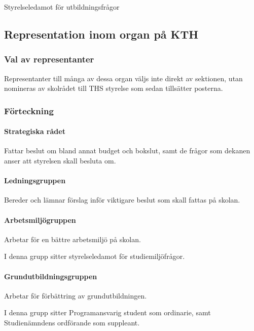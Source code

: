 \documentclass{dgovdoc}
\begin{document}
Styrelseledamot för utbildningsfrågor

\subsection{Representation inom organ på KTH}

\subsubsection{Val av representanter}

Representanter till många av dessa organ väljs inte direkt av sektionen, utan
nomineras av skolrådet till THS styrelse som sedan tillsätter posterna.

\subsubsection{Förteckning}

\paragraph{Strategiska rådet}

Fattar beslut om bland annat budget och bokslut, samt de frågor som dekanen
anser att styrelsen skall besluta om.

\paragraph{Ledningsgruppen}

Bereder och lämnar förslag inför viktigare beslut som skall fattas på skolan.

\paragraph{Arbetsmiljögruppen}

Arbetar för en bättre arbetsmiljö på skolan.

I denna grupp sitter styrelseledamot för studiemiljöfrågor.

\paragraph{Grundutbildningsgruppen}

Arbetar för förbättring av grundutbildningen.

I denna grupp sitter Programansvarig student som ordinarie, samt Studienämndens
ordförande som suppleant.
\end{document}
